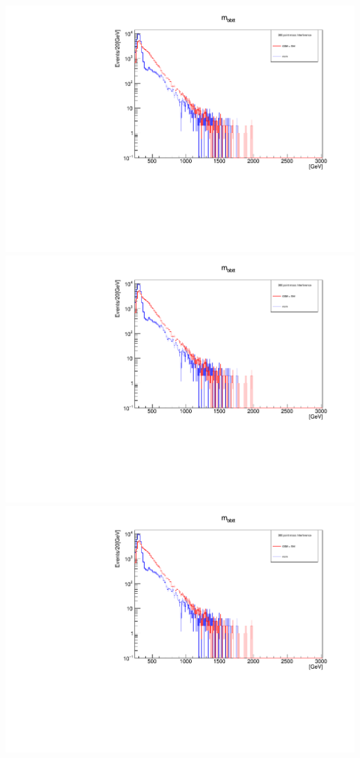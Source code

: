 \documentclass[a4wide,10pt]{article}
\begin{document}
\includegraphics[scale=0.50,page=1]{InterferencePlots15p.pdf}
\includegraphics[scale=0.50,page=2]{InterferencePlots15p.pdf}
\includegraphics[scale=0.50,page=3]{InterferencePlots15p.pdf}
\end{document}
